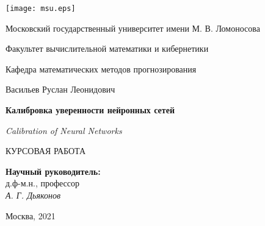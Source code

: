 \documentclass[12pt]{article}
\begin{document}
\begin{titlepage}
\begin{center}

    \texttt{[image: msu.eps]}

    \bigskip
    Московский государственный университет имени М. В. Ломоносова

    Факультет вычислительной математики и кибернетики
    
    Кафедра математических методов прогнозирования

    \vspace{1.5cm}

    {\large Васильев Руслан Леонидович}

    \vspace{1.5cm}

    \textbf{\LARGE Калибровка уверенности нейронных сетей}
    
    \vspace{0.5cm}

    {\Large \textit{Calibration of Neural Networks}}

    \vspace{1.5cm}

    {\large КУРСОВАЯ РАБОТА}
    
    \vspace{1.5cm}

    \begin{flushright}
        \parbox{0.4\textwidth}{
            \textbf{Научный руководитель:}\\
            д.ф-м.н., профессор\\
            \emph{А. Г. Дьяконов}
        }
    \end{flushright}


    \vspace{\fill}
    Москва, 2021
\end{center}
\end{titlepage}
\end{document}
